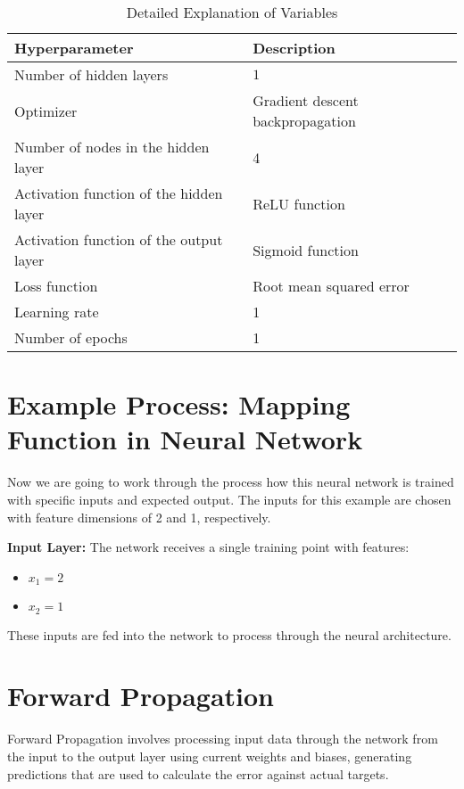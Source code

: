 \documentclass{article}
\begin{document}
\begin{table}[H] %
\centering
\caption{Detailed Explanation of Variables}
\label{tab:variables}
\begin{tabularx}{\textwidth}{AB} %
\toprule

\textbf{Hyperparameter} & \textbf{Description} \\
\midrule
Number of hidden layers & $1$ \\
Optimizer & Gradient descent backpropagation \\
Number of nodes in the hidden layer & 4 \\ 
Activation function of the hidden layer & ReLU function \\
Activation function of the output layer & Sigmoid function \\
Loss function & Root mean squared error \\ 
Learning rate & 1 \\ 
Number of epochs & 1 \\ 

\bottomrule
\end{tabularx}
\end{table}

\section{Example Process: Mapping Function in Neural Network}
Now we are going to work through the process how this neural network is trained with specific inputs and expected output. The inputs for this example are chosen with feature dimensions of 2 and 1, respectively.

\vspace{5mm}

\noindent \textbf{Input Layer:} The network receives a single training point with features:
    \begin{itemize}
        \item $x_1 = 2$ 
        \item $x_2 = 1$ 
    \end{itemize}
    These inputs are fed into the network to process through the neural architecture.

\section{Forward Propagation}
Forward Propagation involves processing input data through the network from the input to the output layer using current weights and biases, generating predictions that are used to calculate the error against actual targets.
\end{document}
